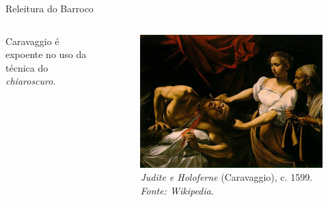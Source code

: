 \documentclass{beamer}
\begin{document}




\begin{frame}{Releitura do Barroco}
\begin{columns}
 \begin{column}{.49\textwidth}
Caravaggio é expoente no uso da técnica do
  \textit{chiaroscuro}.

 \end{column}

 \begin{column}{.49\textwidth}

\begin{figure}[h!]
  \begin{center}
    \includegraphics[width=1.0\textwidth]{figs/caravaggio_judite.png}
    \caption{\emph{Judite e Holoferne} (Caravaggio), c. 1599. \textit{Fonte: Wikipedia}.}
    \label{fig:caravaggio:judite}
\end{center}
\end{figure}

\end{column}
\end{columns}
\end{frame}
\end{document}
